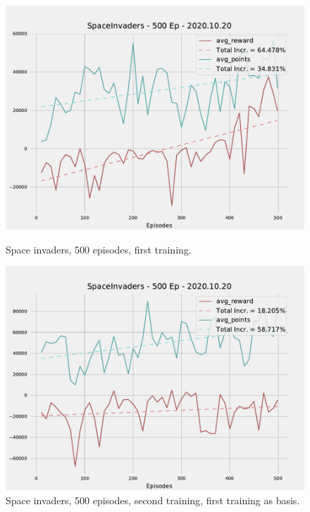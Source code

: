 \documentclass[12pt]{article}
\begin{document}
\begin{figure}
  \vspace{-20pt}
  \begin{center}
\includegraphics[scale=0.4]{pictures/fig.SpaceInvaders - 500 Ep - 2020.10.20 (1).pdf}
\end{center}
  \vspace{-20pt}
  \caption{Space invaders, 500 episodes, first training.}
  \vspace{-10pt}
    \label{fig:spaceinvadersfirst}
      \begin{center}
\includegraphics[scale=0.4]{pictures/fig.SpaceInvaders - 500 Ep - 2020.10.20 (2).pdf}
\end{center}
  \vspace{-20pt}
  \caption{Space invaders, 500 episodes, second training, first training as basis.}
  \vspace{-10pt}
    \label{fig:spaceinvaderssecond}
\end{figure}
\end{document}
